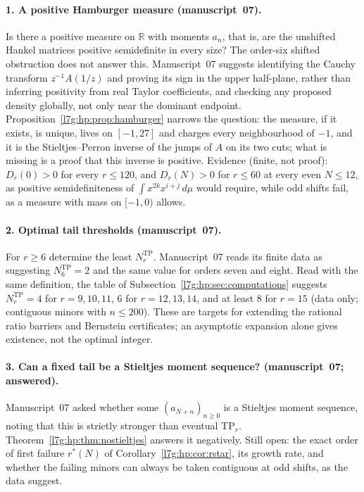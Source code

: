 \documentclass[11pt,letterpaper]{article}
\theoremstyle{remark}\newtheorem{remark}[theorem]{Remark}
\newcommand{\TP}{\mathrm{TP}}\newcommand{\TN}{\mathrm{TN}}
\newcounter{l7gtrsavedeq}
\begin{document}
\paragraph{1. A positive Hamburger measure (manuscript~07).}
Is there a positive measure on $\mathbb R$ with moments $a_n$, that is, are
the unshifted Hankel matrices positive semidefinite in every size? The
order-six shifted obstruction does not answer this. Manuscript~07 suggests
identifying the Cauchy transform $z^{-1}A(1/z)$ and proving its sign in the
upper half-plane, rather than inferring positivity from real Taylor
coefficients, and checking any proposed density globally, not only near
the dominant endpoint. Proposition~\ref{l7g:hp:prop:hamburger} narrows the
question: the measure, if it exists, is unique, lives on $[-1,27]$ and
charges every neighbourhood of $-1$, and it is the Stieltjes--Perron
inverse of the jumps of $A$ on its two cuts; what is missing is a proof that
this inverse is positive. Evidence (finite, not proof): $D_r(0)>0$ for every
$r\le120$, and $D_r(N)>0$ for $r\le60$ at every even $N\le12$, as positive
semidefiniteness of $\int x^{2k}x^{i+j}\,d\mu$ would require, while odd
shifts fail, as a measure with mass on $[-1,0)$ allows.

\paragraph{2. Optimal tail thresholds (manuscript~07).}
For $r\ge6$ determine the least $N^{\TP}_r$. Manuscript~07 reads its finite
data as suggesting $N^{\TP}_6=2$ and the same value for orders seven and
eight. Read with the same definition, the table of
Subsection~\ref{l7g:hp:sec:computations} suggests $N^{\TP}_r=4$ for
$r=9,10,11$, $6$ for $r=12,13,14$, and at least $8$ for $r=15$ (data only;
contiguous minors with $n\le200$). These are targets for extending the
rational ratio barriers and Bernstein certificates; an asymptotic expansion
alone gives existence, not the optimal integer.

\paragraph{3. Can a fixed tail be a Stieltjes moment sequence? (manuscript~07; answered).}
Manuscript~07 asked whether some $(a_{N+n})_{n\ge0}$ is a Stieltjes moment
sequence, noting that this is strictly stronger than eventual $\TP_r$.
Theorem~\ref{l7g:hp:thm:nostieltjes} answers it negatively. Still open: the
exact order of first failure $r^*(N)$ of Corollary~\ref{l7g:hp:cor:rstar},
its growth rate, and whether the failing minors can always be taken
contiguous at odd shifts, as the data suggest.
\end{document}
